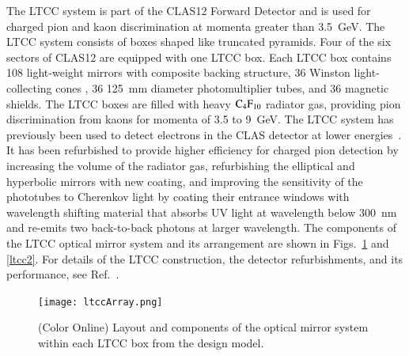 \documentclass[final,3p,twocolumn]{elsarticle}
\begin{document}
The LTCC system is part of the CLAS12  Forward Detector and is used for charged pion and kaon discrimination at
momenta greater than 3.5~GeV. The LTCC system consists of boxes shaped like truncated pyramids. Four of the six
sectors of CLAS12 are equipped with one LTCC box. Each LTCC box contains 108 light-weight mirrors with composite
backing structure, 36 Winston light-collecting cones , 36 125~mm diameter photomultiplier tubes, and 36 magnetic
shields. The LTCC boxes are filled with heavy $\rm C_4F_{10}$ radiator gas, providing pion discrimination from kaons
for momenta of 3.5 to 9~GeV.  The LTCC system has previously been used to detect electrons in the CLAS detector at
lower energies~\cite{Adams:2001kk}. It has been refurbished to provide higher efficiency for charged pion detection
by increasing the volume of the radiator gas, refurbishing the elliptical and hyperbolic mirrors with new coating, and
improving the sensitivity of the phototubes to Cherenkov light by coating their entrance windows with wavelength
shifting material that absorbs UV light at wavelength below 300~nm and re-emits two back-to-back photons at larger
wavelength. The components of the LTCC optical mirror system and its arrangement are shown in Figs.~\ref{ltcc1}
and \ref{ltcc2}.  For details of the LTCC construction, the detector refurbishments, and its performance, see
Ref.~\cite{LTCC}.   

\begin{figure}[htbp!]
\centerline{\texttt{[image: ltccArray.png]}}
\caption{(Color Online) Layout and components of the optical mirror system within each LTCC box from the design model.}
\label{ltcc1}
\end{figure}
\end{document}
